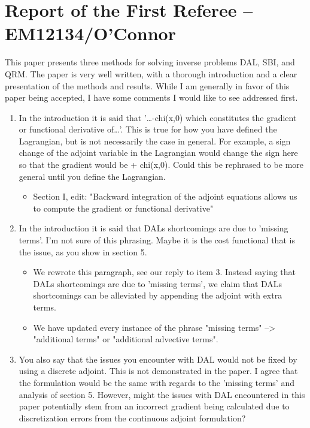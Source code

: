 \documentclass[%
 letter,
 amsmath,amssymb,
]{revtex4-2}
\begin{document}
\section*{Report of the First Referee -- EM12134/O'Connor}
  
This paper presents three methods for solving inverse problems DAL, SBI, and QRM. The paper is very well written, with a thorough introduction and a clear presentation of the methods and results. While I am generally in favor of this paper being accepted, I have some comments I would like to see addressed first.  

\begin{enumerate}

\color{black}\item In the introduction it is said that '…-chi(x,0) which constitutes  the gradient or functional derivative of…'. This is true for how you  have defined the Lagrangian, but is not necessarily the case in  general. For example, a sign change of the adjoint variable in the  Lagrangian would change the sign here so that the gradient would be +  chi(x,0). Could this be rephrased to be more general until you define the Lagrangian.  \\
\color{blue}\begin{itemize}

\item Section I, edit: "Backward integration of the adjoint equations allows us to compute the gradient or functional derivative"
  
\end{itemize}\color{black}\item In the introduction it is said that DALs shortcomings are due to  'missing terms'. I'm not sure of this phrasing. Maybe it is the cost  functional that is the issue, as you show in section 5.  \\
\color{blue}\begin{itemize}

\item We rewrote this paragraph, see our reply to item 3. Instead saying that DALs shortcomings are due to 'missing terms', we claim that DALs shortcomings can be alleviated by appending the adjoint with extra terms.
\item We have updated every instance of the phrase "missing terms" --> "additional terms" or "additional advective terms".


\end{itemize}\color{black}\item You also say that the issues you encounter with DAL would not be  fixed by using a discrete adjoint. This is not demonstrated in the  paper. I agree that the formulation would be the same with regards to  the 'missing terms' and analysis of section 5. However, might the  issues with DAL encountered in this paper potentially stem from an  incorrect gradient being calculated due to discretization errors from  the continuous adjoint formulation?  \\
\color{blue}\begin{itemize}


\end{itemize}
\end{enumerate}
\end{document}
